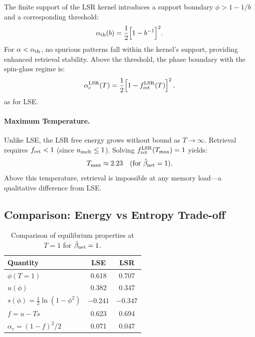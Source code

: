 \documentclass{article}
\theoremstyle{plain}
\theoremstyle{definition}
\theoremstyle{remark}
\begin{document}
The finite support of the LSR kernel introduces a support boundary $\phi > 1 - 1/b$ and a corresponding threshold:
\begin{equation}
    \alpha_{\rm th}(b) = \frac{1}{2}\Big[1 - b^{-1}\Big]^2.
\end{equation}
For $\alpha < \alpha_{\rm th}$, no spurious patterns fall within the kernel's support, providing enhanced retrieval stability. Above the threshold, the phase boundary with the spin-glass regime is:
\begin{equation}
    \alpha_c^{\rm LSR}(T) = \frac{1}{2} \Big[1 - f_{\rm ret}^{\rm LSR}(T) \Big]^2\,,
    \label{eq:alpha_lsr}
\end{equation}
as for LSE.


\paragraph{Maximum Temperature.} Unlike LSE, the LSR free energy grows without bound as $T \to \infty$. Retrieval requires $f_{\rm ret} < 1$ (since $u_{\rm melt} \le 1$). Solving $f_{\rm ret}^{\rm LSR}(T_{\max}) = 1$ yields:
\begin{equation}
    T_{\max} \approx 2.23 \quad (\text{for } \hat{\beta}_{\rm net} = 1).
\end{equation}
Above this temperature, retrieval is impossible at any memory load---a qualitative difference from LSE.

\subsection{Comparison: Energy vs Entropy Trade-off}

\begin{table}[t]
\caption{Comparison of equilibrium properties at $T = 1$ for $\hat{\beta}_{\rm net} = 1$.}
\label{tab:comparison}
\vskip 0.1in
\begin{center}
\begin{small}
\begin{tabular}{lcc}
\toprule
Quantity & LSE & LSR \\
\midrule
$\phi(T=1)$ & 0.618 & 0.707 \\
$u(\phi)$ & 0.382 & 0.347 \\
$s(\phi) = \frac{1}{2}\ln(1-\phi^2)$ & $-0.241$ & $-0.347$ \\
$f = u - Ts$ & 0.623 & 0.694 \\
$\alpha_c = (1-f)^2/2$ & 0.071 & 0.047 \\
\bottomrule
\end{tabular}
\end{small}
\end{center}
\end{table}
\end{document}
